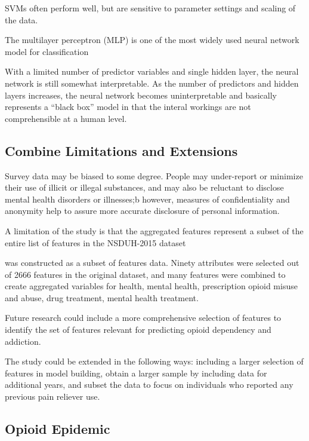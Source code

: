 \documentclass[sigconf]{acmart}
\begin{document}
SVMs often perform well, but are sensitive to parameter settings 
and scaling of the data. 

The multilayer perceptron (MLP) is one of the most widely used neural network 
model for classification 

With a limited number of predictor variables and single 
hidden layer, the neural network is still somewhat interpretable. As the 
number of predictors and hidden layers increases, the neural network becomes 
uninterpretable and basically represents a ``black box'' model in that 
the interal workings are not comprehensible at a human level. 



\subsection{Combine Limitations and Extensions}

Survey data may be biased to some degree. People may under-report or minimize 
their use of illicit or illegal substances, and may also be reluctant to 
disclose mental health disorders or illnesses;b however, measures of 
confidentiality and anonymity help to assure more accurate disclosure 
of personal information. 

A limitation of the study is that the aggregated features represent a subset
of the entire list of features in the NSDUH-2015 dataset 


was constructed as a subset of 
features data. 
Ninety attributes were selected out of 2666 features in the original dataset, 
and many features were combined to create aggregated variables for health, 
mental health, prescription opioid misuse and abuse, drug treatment, mental health
treatment. 

Future research could include a more comprehensive selection of
features to identify the set of features relevant for predicting opioid
dependency and addiction. 

The study could be extended in the following ways: including a larger
selection of features in model building, obtain a larger sample by including 
data for additional years, and subset the data to focus on individuals who 
reported any previous pain reliever use. 



\subsection{Opioid Epidemic}
\end{document}
